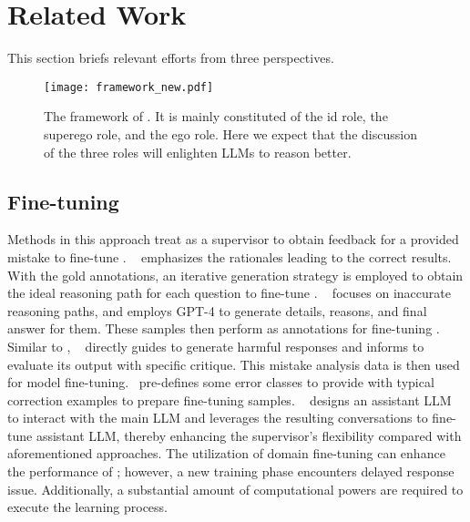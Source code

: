 \section{Related Work}
\label{sec:rel}


This section briefs relevant efforts from three perspectives.

\begin{figure*}
	\centering
        \vspace{-1ex}
	\texttt{[image: framework\_new.pdf]}
	\vspace{-4ex}
	\caption{The framework of \ours. It is mainly constituted of the id role, the superego role, and the ego role. Here we expect that the discussion of the three roles will  enlighten LLMs to reason better.}
 \label{fig:framework}
 \vspace{-3ex}
\end{figure*}


\subsection{Fine-tuning \llm}
Methods in this approach treat \llm as a supervisor to obtain feedback for a provided mistake to fine-tune \llm.
\sta~\cite{DBLP:conf/nips/ZelikmanWMG22} emphasizes the rationales leading to the correct results. With the gold annotations, an iterative generation strategy is employed to obtain the ideal reasoning path for each question to fine-tune \llm.
\lema~\cite{DBLP:journals/corr/abs-2310-20689} focuses on inaccurate reasoning paths, and employs GPT-4 to generate details, reasons, and final answer for them. These samples then perform as annotations for fine-tuning \llm.
Similar to \lema, \gwfs~\cite{DBLP:journals/corr/abs-2310-10477} directly guides \llm to generate harmful responses and informs \llm to evaluate its output with specific critique. This mistake analysis data is then used for model fine-tuning. 
\srethink~\cite{DBLP:conf/acl/TongLWWTS24}pre-defines some error classes to provide \llm with typical correction examples to prepare fine-tuning samples.
\salam~\cite{DBLP:conf/emnlp/WangL23} designs an assistant LLM to interact with the main LLM and leverages the resulting conversations to fine-tune assistant LLM, thereby enhancing the supervisor's flexibility compared with aforementioned approaches.
The utilization of domain fine-tuning can enhance the performance of \llm; however, a new training phase encounters delayed response issue. 
Additionally, a substantial amount of computational powers are required to execute the learning process. 

